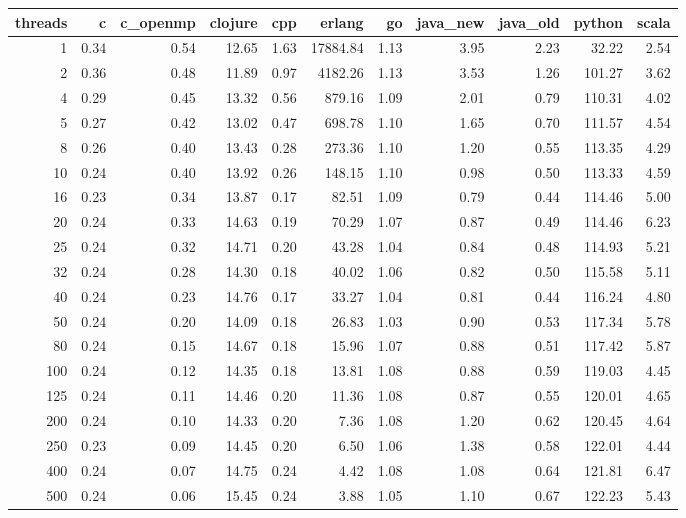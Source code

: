 \begin{table}[ht]
\centering
\begin{tabular}{rrrrrrrrrrr}
  \hline
threads & c & c\_openmp & clojure & cpp & erlang & go & java\_new & java\_old & python & scala \\ 
  \hline
  1 & 0.34 & 0.54 & 12.65 & 1.63 & 17884.84 & 1.13 & 3.95 & 2.23 & 32.22 & 2.54 \\ 
    2 & 0.36 & 0.48 & 11.89 & 0.97 & 4182.26 & 1.13 & 3.53 & 1.26 & 101.27 & 3.62 \\ 
    4 & 0.29 & 0.45 & 13.32 & 0.56 & 879.16 & 1.09 & 2.01 & 0.79 & 110.31 & 4.02 \\ 
    5 & 0.27 & 0.42 & 13.02 & 0.47 & 698.78 & 1.10 & 1.65 & 0.70 & 111.57 & 4.54 \\ 
    8 & 0.26 & 0.40 & 13.43 & 0.28 & 273.36 & 1.10 & 1.20 & 0.55 & 113.35 & 4.29 \\ 
   10 & 0.24 & 0.40 & 13.92 & 0.26 & 148.15 & 1.10 & 0.98 & 0.50 & 113.33 & 4.59 \\ 
   16 & 0.23 & 0.34 & 13.87 & 0.17 & 82.51 & 1.09 & 0.79 & 0.44 & 114.46 & 5.00 \\ 
   20 & 0.24 & 0.33 & 14.63 & 0.19 & 70.29 & 1.07 & 0.87 & 0.49 & 114.46 & 6.23 \\ 
   25 & 0.24 & 0.32 & 14.71 & 0.20 & 43.28 & 1.04 & 0.84 & 0.48 & 114.93 & 5.21 \\ 
   32 & 0.24 & 0.28 & 14.30 & 0.18 & 40.02 & 1.06 & 0.82 & 0.50 & 115.58 & 5.11 \\ 
   40 & 0.24 & 0.23 & 14.76 & 0.17 & 33.27 & 1.04 & 0.81 & 0.44 & 116.24 & 4.80 \\ 
   50 & 0.24 & 0.20 & 14.09 & 0.18 & 26.83 & 1.03 & 0.90 & 0.53 & 117.34 & 5.78 \\ 
   80 & 0.24 & 0.15 & 14.67 & 0.18 & 15.96 & 1.07 & 0.88 & 0.51 & 117.42 & 5.87 \\ 
  100 & 0.24 & 0.12 & 14.35 & 0.18 & 13.81 & 1.08 & 0.88 & 0.59 & 119.03 & 4.45 \\ 
  125 & 0.24 & 0.11 & 14.46 & 0.20 & 11.36 & 1.08 & 0.87 & 0.55 & 120.01 & 4.65 \\ 
  200 & 0.24 & 0.10 & 14.33 & 0.20 & 7.36 & 1.08 & 1.20 & 0.62 & 120.45 & 4.64 \\ 
  250 & 0.23 & 0.09 & 14.45 & 0.20 & 6.50 & 1.06 & 1.38 & 0.58 & 122.01 & 4.44 \\ 
  400 & 0.24 & 0.07 & 14.75 & 0.24 & 4.42 & 1.08 & 1.08 & 0.64 & 121.81 & 6.47 \\ 
  500 & 0.24 & 0.06 & 15.45 & 0.24 & 3.88 & 1.05 & 1.10 & 0.67 & 122.23 & 5.43 \\ 
   \hline
\end{tabular}
\end{table}
